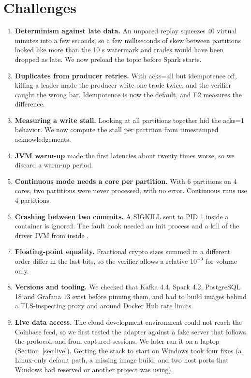 \section{Challenges}
\label{sec:challenges}
\begin{enumerate}
  \item \textbf{Determinism against late data.} An unpaced replay squeezes 40 virtual minutes into a few
        seconds, so a few milliseconds of skew between partitions looked like more than the 10 s watermark
        and trades would have been dropped as late. We now preload the topic before Spark starts.
  \item \textbf{Duplicates from producer retries.} With acks=all but idempotence off, killing a leader made
        the producer write one trade twice, and the verifier caught the wrong bar. Idempotence is now the
        default, and E2 measures the difference.
  \item \textbf{Measuring a write stall.} Looking at all partitions together hid the acks=1 behavior.
        We now compute the stall per partition from timestamped acknowledgements.
  \item \textbf{JVM warm-up} made the first latencies about twenty times worse, so we discard a warm-up
        period.
  \item \textbf{Continuous mode needs a core per partition.} With 6 partitions on 4 cores, two partitions were
        never processed, with no error. Continuous runs use 4 partitions.
  \item \textbf{Crashing between two commits.} A SIGKILL sent to PID 1 inside a container is ignored. The fault
        hook needed an init process and a kill of the driver JVM from inside .
  \item \textbf{Floating-point equality.} Fractional crypto sizes summed in a different order differ in
        the last bits, so the verifier allows a relative $10^{-9}$ for volume only.
  \item \textbf{Versions and tooling.} We checked that Kafka 4.4, Spark 4.2, PostgreSQL 18 and Grafana 13
        exist before pinning them, and had to build images behind a TLS-inspecting proxy and around Docker
        Hub rate limits.
  \item \textbf{Live data access.} The cloud development environment could not reach the Coinbase feed, so we
        first tested the adapter against a fake server that follows the protocol, and from captured sessions. We
        later ran it on a laptop (Section~\ref{sec:live}). Getting the stack to start on Windows took four fixes
        (a Linux-only default path, a missing image build, and two host ports that Windows had reserved or
        another project was using).
\end{enumerate}

